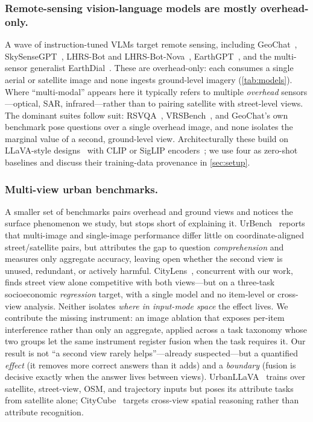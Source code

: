 \subsubsection{Remote-sensing vision-language models are mostly overhead-only.}
A wave of instruction-tuned VLMs target remote sensing, including
GeoChat~\cite{geochat2024}, SkySenseGPT~\cite{skysensegpt2024},
LHRS-Bot and LHRS-Bot-Nova~\cite{lhrsbot2024,lhrsbotnova2025},
EarthGPT~\cite{zhang2024earthgpt}, and the multi-sensor generalist
EarthDial~\cite{earthdial2025}. These are overhead-only: each consumes a single
aerial or satellite image and none ingests ground-level imagery (\cref{tab:models}).
Where ``multi-modal'' appears here it typically refers to multiple \emph{overhead}
sensors---optical, SAR, infrared---rather than to pairing satellite with
street-level views. The dominant suites follow suit: RSVQA~\cite{lobry2020rsvqa},
VRSBench~\cite{li2024vrsbench}, and GeoChat's own benchmark pose questions over a
single overhead image, and none isolates the marginal value of a second,
ground-level view. Architecturally these build on LLaVA-style designs~\cite{llava_2023,llava15_2024}
with CLIP or SigLIP encoders~\cite{clip_2021,siglip_2023}; we use four as zero-shot
baselines and discuss their training-data provenance in \cref{sec:setup}.

\subsubsection{Multi-view urban benchmarks.}
A smaller set of benchmarks pairs overhead and ground views and notices the surface
phenomenon we study, but stops short of explaining it. UrBench~\cite{urbench2025}
reports that multi-image and single-image performance differ little on
coordinate-aligned street/satellite pairs, but attributes the gap to question
\emph{comprehension} and measures only aggregate accuracy, leaving open whether the
second view is unused, redundant, or actively harmful. CityLens~\cite{citylens2026},
concurrent with our work, finds street view alone competitive with both views---but
on a three-task socioeconomic \emph{regression} target, with a single model and no
item-level or cross-view analysis. Neither isolates \emph{where in input-mode space}
the effect lives. We contribute the missing instrument: an image ablation that
exposes per-item interference rather than only an aggregate, applied across a task
taxonomy whose two groups let the same instrument register fusion when the task
requires it. Our result is not ``a second view rarely helps''---already
suspected---but a quantified \emph{effect} (it removes more correct answers than it
adds) and a \emph{boundary} (fusion is decisive exactly when the answer lives between
views). UrbanLLaVA~\cite{urbanllava2025}
trains over satellite, street-view, OSM, and trajectory inputs but poses its
attribute tasks from satellite alone; CityCube~\cite{citycube2026} targets cross-view
spatial reasoning rather than attribute recognition.

